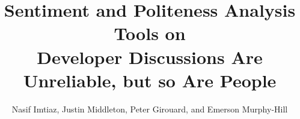 \documentclass[sigconf]{acmart}
\begin{document}
\title{Sentiment and Politeness Analysis Tools on\\Developer Discussions Are Unreliable, but so Are People}

\author{Nasif Imtiaz, Justin Middleton, Peter Girouard, and Emerson Murphy-Hill }
\end{document}
